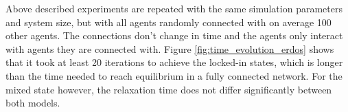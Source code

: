 \documentclass[]{article}
\begin{document}
Above described experiments are repeated with the same simulation parameters and system size, but with all agents randomly connected with on average 100 other agents. The connections don't change in time and the agents only interact with agents they are connected with. Figure \ref{fig:time_evolution_erdos} shows that it took at least 20 iterations to achieve the locked-in states, which is longer than the time needed to reach equilibrium in a fully connected network. For the mixed state however, the relaxation time does not differ significantly between both models.


%
% 
% 
 

%
\end{document}
